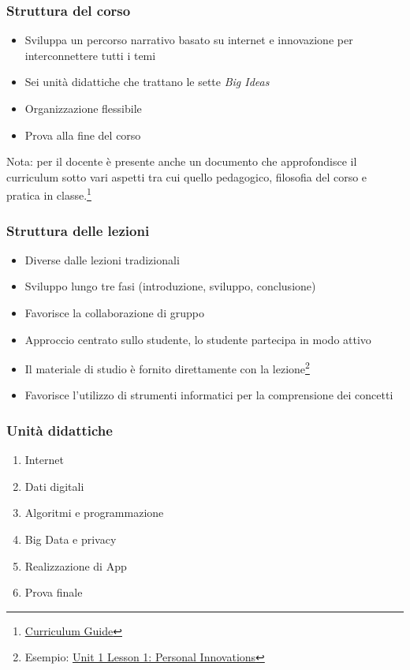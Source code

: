 \documentclass[
    hyperref={colorlinks,citecolor=black,linkcolor=black,urlcolor=blue}
]{beamer}
\begin{document}
\begin{frame}
  \frametitle{Struttura del corso}

  \begin{itemize}
    \item Sviluppa un percorso narrativo basato su internet e innovazione per interconnettere tutti i temi
    \item Sei unità didattiche che trattano le sette \emph{Big Ideas}
    \item Organizzazione flessibile
    \item Prova alla fine del corso
  \end{itemize}

  Nota: per il docente è presente anche un documento che approfondisce il curriculum sotto vari aspetti tra cui quello pedagogico, filosofia del corso e pratica in classe.\footnote{\href{https://docs.google.com/document/d/1ZVzF_-cON8pjDVUOZjVk32y4flCMXugcrA6gFeWDHzE/preview}{Curriculum Guide}}
\end{frame}

\begin{frame}
  \frametitle{Struttura delle lezioni}

  \begin{itemize}
    \item Diverse dalle lezioni tradizionali
    \item Sviluppo lungo tre fasi (introduzione, sviluppo, conclusione)
    \item Favorisce la collaborazione di gruppo
    \item Approccio centrato sullo studente, lo studente partecipa in modo attivo
    \item Il materiale di studio è fornito direttamente con la lezione\footnote{Esempio: \href{https://curriculum.code.org/csp-19/unit1/1/}{Unit 1 Lesson 1: Personal Innovations}}
    \item Favorisce l'utilizzo di strumenti informatici per la comprensione dei concetti
  \end{itemize}
\end{frame}

\begin{frame}
  \frametitle{Unità didattiche}

  \begin{enumerate}
    \item Internet
    \item Dati digitali
    \item Algoritmi e programmazione
    \item Big Data e privacy
    \item Realizzazione di App
    \item Prova finale
  \end{enumerate}
\end{frame}
\end{document}

